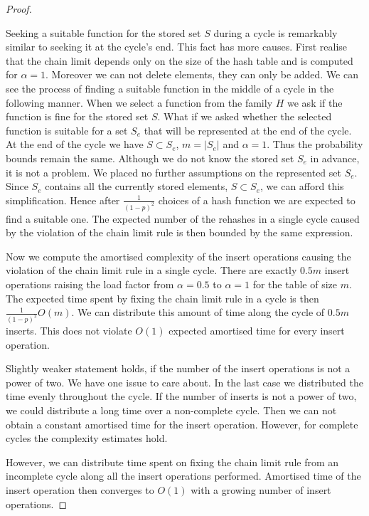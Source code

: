 \begin{proof}
\begin{itemize}
Seeking a suitable function for the stored set $S$ during a cycle is remarkably similar to seeking it at the cycle's end. This fact has more causes. First realise that the chain limit depends only on the size of the hash table and is computed for $\alpha = 1$. Moreover we can not delete elements, they can only be added. We can see the process of finding a suitable function in the middle of a cycle in the following manner. When we select a function from the family $H$ we ask if the function is fine for the stored set $S$. What if we asked whether the selected function is suitable for a set $S_e$ that will be represented at the end of the cycle. At the end of the cycle we have $S \subset S_e$, $m = |S_e|$ and $\alpha = 1$. Thus the probability bounds remain the same. Although we do not know the stored set $S_e$ in advance, it is not a problem. We placed no further assumptions on the represented set $S_e$. Since $S_e$ contains all the currently stored elements, $S \subset S_e$, we can afford this simplification. Hence after $\frac{1}{(1-p)^2}$ choices of a hash function we are expected to find a suitable one. The expected number of the rehashes in a single cycle caused by the violation of the chain limit rule is then bounded by the same expression. 

Now we compute the amortised complexity of the insert operations causing the violation of the chain limit rule in a single cycle. There are exactly $0.5 m$ insert operations raising the load factor from $\alpha = 0.5$ to $\alpha = 1$ for the table of size $m$. The expected time spent by fixing the chain limit rule in a cycle is then $\frac{1}{(1 - p)^2}O(m)$. We can distribute this amount of time along the cycle of $0.5 m$ inserts. This does not violate $O(1)$ expected amortised time for every insert operation.
\end{itemize}

Slightly weaker statement holds, if the number of the insert operations is not a power of two. We have one issue to care about. In the last case we distributed the time evenly throughout the cycle. If the number of inserts is not a power of two, we could distribute a long time over a non-complete cycle. Then we can not obtain a constant amortised time for the insert operation. However, for complete cycles the complexity estimates hold.

However, we can distribute time spent on fixing the chain limit rule from an incomplete cycle along all the insert operations performed. Amortised time of the insert operation then converges to $O(1)$ with a growing number of insert operations.
\end{proof}

